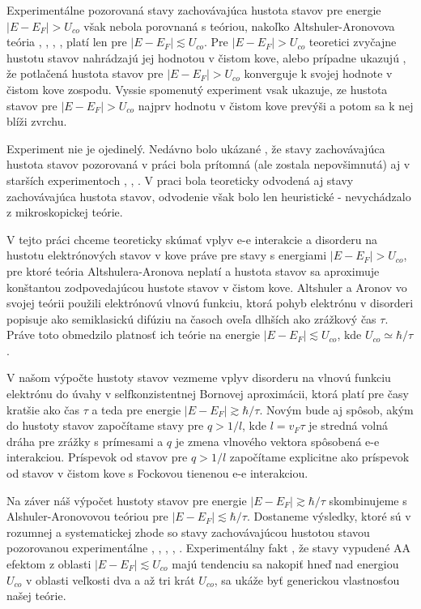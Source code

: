 Experimentálne pozorovaná \cite{Mazur} stavy zachovávajúca hustota stavov pre energie $|E-E_F| > U_{co}$  však nebola porovnaná s teóriou, nakoľko Altshuler-Aronovova teória  \cite{Altshuler1}, \cite{Altshuler3}, \cite{Altshuler4},  \cite{LeeRamakrishnan}, \cite{Imry} platí len pre $|E-E_F| \lesssim U_{co}$. Pre $|E-E_F| > U_{co}$ teoretici \cite{hlubina} zvyčajne hustotu stavov nahrádzajú jej hodnotou v čistom kove, alebo prípadne ukazujú \cite{rabatin}, že potlačená hustota stavov pre
$|E-E_F| > U_{co}$ konverguje k svojej hodnote v čistom kove zospodu. Vyssie spomenutý experiment \cite{Mazur} vsak ukazuje, ze hustota stavov pre $|E-E_F| > U_{co}$ najprv hodnotu v čistom kove
prevýši a potom sa k nej blíži zvrchu. 

Experiment \cite{Mazur} nie je ojedinelý. 
Nedávno bolo ukázané \cite{Moskova}, že stavy zachovávajúca hustota stavov pozorovaná v práci \cite{Mazur} bola prítomná (ale zostala nepovšimnutá) aj v starších experimentoch \cite{Schmitz1}, \cite{Schmitz2}, \cite{Escudero}. V praci \cite{Moskova} bola teoreticky odvodená aj stavy zachovávajúca hustota stavov, odvodenie však bolo len heuristické - nevychádzalo z mikroskopickej teórie.

V tejto práci chceme teoreticky skúmať vplyv e-e interakcie a disorderu na
hustotu elektrónových stavov v kove práve pre stavy s energiami $|E-E_F| > U_{co}$, pre ktoré teória Altshulera-Aronova neplatí a hustota stavov sa aproximuje konštantou zodpovedajúcou hustote stavov v čistom kove. Altshuler a Aronov vo svojej teórii použili elektrónovú vlnovú funkciu, ktorá pohyb elektrónu v disorderi popisuje ako semiklasickú difúziu na časoch oveľa dlhších ako zrážkový čas $\tau$. Práve toto  obmedzilo platnosť ich teórie na energie $|E-E_F| \lesssim U_{co}$, kde $U_{co} \simeq \hbar/\tau$.
 
 V našom výpočte hustoty stavov vezmeme vplyv disorderu na vlnovú funkciu elektrónu do úvahy v selfkonzistentnej Bornovej aproximácii, ktorá platí pre časy kratšie ako čas $\tau$ a teda pre energie $|E-E_F|  \gtrsim \hbar/\tau$. Novým bude aj spôsob, akým do hustoty stavov započítame stavy pre $q > 1/l$, kde $l = v_F \tau$ je stredná volná dráha pre zrážky s prímesami a $q$ je zmena vlnového vektora spôsobená e-e interakciou. Príspevok od stavov pre $q > 1/l$  započítame
 explicitne ako príspevok od stavov v čistom kove s Fockovou tienenou e-e interakciou. 
 
  Na záver náš výpočet hustoty stavov pre energie $|E-E_F|  \gtrsim \hbar/\tau$ skombinujeme s Alshuler-Aronovovou teóriou pre $|E-E_F|  \lesssim \hbar/\tau$. Dostaneme výsledky, ktoré sú v rozumnej a systematickej zhode so stavy zachovávajúcou hustotou stavou pozorovanou experimentálne \cite{Mazur}, \cite{Schmitz1}, \cite{Schmitz2}, \cite{Escudero}, \cite{Moskova}. Experimentálny fakt \cite{Mazur}, že stavy vypudené AA efektom z oblasti $|E-E_F| \lesssim U_{co}$ majú tendenciu sa nakopiť hneď nad energiou $U_{co}$ v oblasti veľkosti dva a až tri krát $U_{co}$, sa ukáže byť generickou vlastnosťou našej teórie.


